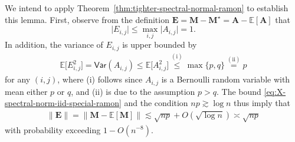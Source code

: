 We intend to apply Theorem~\ref{thm:tighter-spectral-normal-ramon} to establish this lemma.
First, observe from the definition $\bm{E}=\bm{M}-\bm{M}^{\star}=\bm{A}-\mathbb{E}[\bm{A}]$ that
%
\[
	\big|E_{i,j}\big|\leq  \max_{i,j}\big|A_{i,j}\big| = 1.
\]
%
In addition, the variance of $E_{i,j}$ is upper bounded by
%
\begin{align*}
	 \mathbb{E}\big[E_{i,j}^{2}\big]  = \mathsf{Var}(A_{i,j})
	 \leq \mathbb{E}\big[A_{i,j}^{2}\big]
 	 \overset{(\mathrm{i})}{\leq}\max\{p,q\}\overset{(\mathrm{ii})}{=} p
\end{align*}
%
for any $(i,j)$,
where %
(i) follows since $A_{i,j}$ is a Bernoulli random variable with mean either $p$ or $q$, and (ii) is due to the assumption $p>q$.
The bound \eqref{eq:X-spectral-norm-iid-special-ramon} and the condition $np\gtrsim \log n$ thus imply that
%
\begin{align}
	\|\bm{E}\|= \big\| \bm{M} - \mathbb{E}[\bm{M}] \big\| \lesssim \sqrt{np} + O(\sqrt{\log n}) \asymp \sqrt{np}
\end{align}
%
with probability exceeding $1-O(n^{-8})$.
